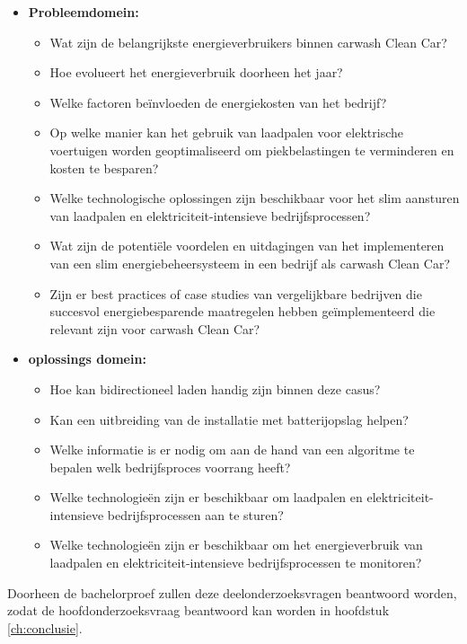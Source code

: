 \begin{itemize}
  \item \textbf{Probleemdomein:}
        \begin{itemize}
          \item Wat zijn de belangrijkste energieverbruikers binnen carwash Clean Car?
          \item Hoe evolueert het energieverbruik doorheen het jaar?
          \item Welke factoren beïnvloeden de energiekosten van het bedrijf?
          \item Op welke manier kan het gebruik van laadpalen voor elektrische voertuigen worden geoptimaliseerd om piekbelastingen te verminderen en kosten te besparen?
          \item Welke technologische oplossingen zijn beschikbaar voor het slim aansturen van laadpalen en elektriciteit-intensieve bedrijfsprocessen?
          \item Wat zijn de potentiële voordelen en uitdagingen van het implementeren van een slim energiebeheersysteem in een bedrijf als carwash Clean Car?
          \item Zijn er best practices of case studies van vergelijkbare bedrijven die succesvol energiebesparende maatregelen hebben geïmplementeerd die relevant zijn voor carwash Clean Car?
        \end{itemize}
  \item  \textbf{oplossings domein:}
        \begin{itemize}
          \item Hoe kan bidirectioneel laden handig zijn binnen deze casus?
          \item Kan een uitbreiding van de installatie met batterijopslag helpen?
          \item Welke informatie is er nodig om aan de hand van een algoritme te bepalen welk bedrijfsproces voorrang heeft?
          \item Welke technologieën zijn er beschikbaar om laadpalen en elektriciteit-intensieve bedrijfsprocessen aan te sturen?
          \item Welke technologieën zijn er beschikbaar om het energieverbruik van laadpalen en elektriciteit-intensieve bedrijfsprocessen te monitoren?
        \end{itemize}
\end{itemize}

Doorheen de bachelorproef zullen deze deelonderzoeksvragen beantwoord worden, zodat de hoofdonderzoeksvraag beantwoord kan worden in hoofdstuk \ref{ch:conclusie}.

